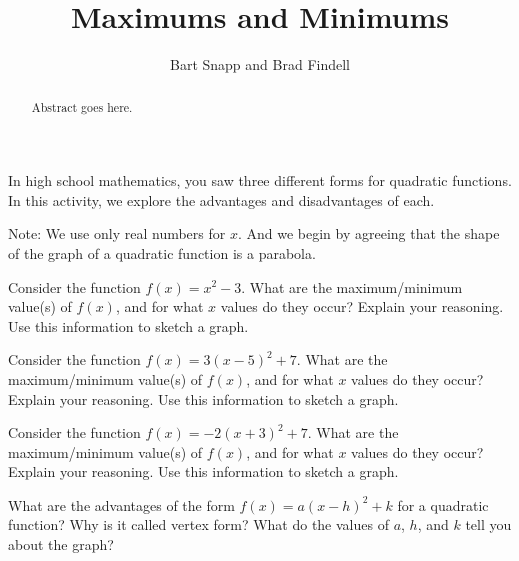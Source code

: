 \documentclass{ximera}
\title{Maximums and Minimums}
\author{Bart Snapp and Brad Findell}
\begin{document}
\begin{abstract}
Abstract goes here.  
\end{abstract}
\maketitle

\label{A:vertex}


%
%

  

In high school mathematics, you saw three different forms for quadratic functions.  In this activity, we explore the advantages and disadvantages of each.  

Note:  We use only real numbers for $x$.  And we begin by agreeing that the shape of the graph of a quadratic function is a parabola.  

\begin{problem}
Consider the function $f(x) = x^2 -3$. What are the maximum/minimum value(s) of $f(x)$, and for what $x$ values do they occur? 
Explain your reasoning.  Use this information to sketch a graph.  
\end{problem}

\begin{problem}
Consider the function $f(x) = 3(x-5)^2 +7$. What are the maximum/minimum value(s) of $f(x)$, and for what $x$ values do they occur? Explain your reasoning.  Use this information to sketch a graph.  
\end{problem}

\begin{problem}
Consider the function $f(x) = -2(x+3)^2 + 7$. What are the maximum/minimum value(s) of $f(x)$, and for what $x$ values do they occur? Explain your reasoning.  Use this information to sketch a graph.  
\end{problem}

\begin{problem}
What are the advantages of the form $f(x) = a(x-h)^2+k$ for a quadratic function?  Why is it called vertex form?  What do the values of $a$, $h$, and $k$ tell you about the graph?  
\end{problem}
\end{document}
